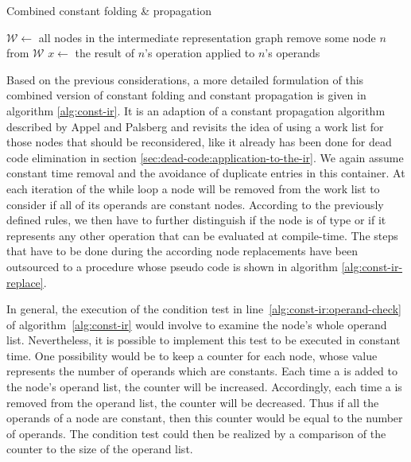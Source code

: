 \begin{algorithm}[t]
\caption{Combined constant folding \& propagation}
\label{alg:const-ir}
\begin{algorithmic}[1]
\State $\mathcal{W} \gets$ all nodes in the intermediate representation graph
	\State remove some node $n$ from $\mathcal{W}$
	\label{alg:const-ir:operand-check}
		\label{alg:const-ir:operand-check-equal}
			\State {}
		\label{alg:const-ir:if-evaluatable}
			\State $x \gets$ the result of $n$'s operation applied to $n$'s operands\label{alg:const-ir:cont-init}
			\State {}
		\EndIf
	\EndIf
\EndWhile
\end{algorithmic}
\end{algorithm}

Based on the previous considerations, a more detailed formulation of this combined version of constant folding and constant propagation is given in algorithm \ref{alg:const-ir}. It is an adaption of a constant propagation algorithm described by Appel and Palsberg \cite{appel:2004:moderncompilerimpl} and revisits the idea of using a work list for those nodes that should be reconsidered, like it already has been done for dead code elimination in section \ref{sec:dead-code:application-to-the-ir}. We again assume constant time removal and the avoidance of duplicate entries in this container. At each iteration of the while loop a node will be removed from the work list to consider if all of its operands are constant nodes. According to the previously defined rules, we then have to further distinguish if the node is of type  or if it represents any other operation that can be evaluated at compile-time. The steps that have to be done during the according node replacements have been outsourced to a procedure whose pseudo code is shown in algorithm \ref{alg:const-ir-replace}.

In general, the execution of the condition test in line~\ref{alg:const-ir:operand-check} of algorithm~\ref{alg:const-ir} would involve to examine the node's whole operand list. Nevertheless, it is possible to implement this test to be executed in constant time. One possibility would be to keep a counter for each node, whose value represents the number of operands which are constants. Each time a  is added to the node's operand list, the counter will be increased. Accordingly, each time a  is removed from the operand list, the counter will be decreased. Thus if all the operands of a node are constant, then this counter would be equal to the number of operands. The condition test could then be realized by a comparison of the counter to the size of the operand list.

